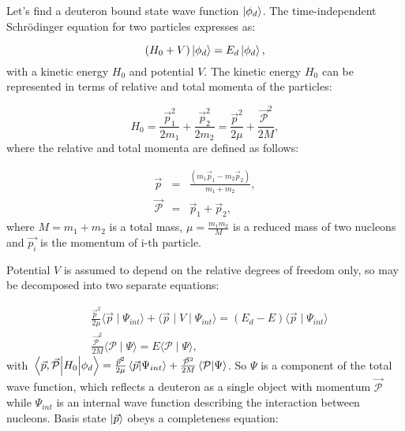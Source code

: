     Let's find a deuteron bound state wave function $\ket{\phi_d}$. 
    The time-independent Schr\"{o}dinger equation for two particles expresses as:

    \begin{equation}
        (H_0 + V) \ket{\phi_d}  = E_d \ket{\phi_d},
        \label{shrod_bound}
    \end{equation}
    with a kinetic energy $H_0$ and potential $V$. 
    The kinetic energy $H_0$ can be represented in terms of  relative and total momenta
    of the particles:

    \begin{equation}
        H_0 = \frac{\vec{p}_1^2}{2m_1} + \frac{\vec{p}_2^2}{2m_2} = 
        \frac{\vec{p}^2}{2\mu} + \frac{\vec{\mathcal{P}}^2}{2M}, 
    \end{equation}
    where the relative and total momenta are defined as follows:

    \begin{eqnarray}
        \vec{p} &=& \frac{(m_1\vec{p}_1 - m_2\vec{p}_2)}{m_1 + m_2},\\
        \vec{\mathcal{P}} &=& \vec{p}_1 + \vec{p}_2,
    \end{eqnarray}
    where $M = m_1 + m_2$ is a total mass, $\mu = \frac{m_1m_2}{M}$ is a reduced mass of two nucleons and 
    $\vec{p_i}$ is the momentum of i-th particle.

    Potential $V$ is assumed to depend on the relative degrees of freedom only, so
     may be decomposed into two separate equations:

    \begin{eqnarray}
        &\frac{\vec{p}^2}{2\mu} \langle \vec{p} \mid \Psi_{int} \rangle +
        \langle \vec{p} \mid V \mid \Psi_{int} \rangle = 
        (E_d - E)\langle \vec{p} \mid \Psi_{int} \rangle \label{se1}\\
        &\frac{\vec{\mathcal{P}}^2}{2M} \langle \mathcal{P} \mid \Psi \rangle = 
        E\langle \mathcal{P} \mid \Psi \rangle \label{se2},
    \end{eqnarray}
    with $\matrixel{\vec{p},\vec{\mathcal{P}}}{H_0}{\phi_d} = \frac{\vec{p}^2}{2\mu} \braket{\vec{p}}{\Psi_{int}} +
    \frac{\vec{\mathcal{P}}^2}{2M} \braket {\mathcal{P}} {\Psi} $. So $\Psi$ is a component 
    of the total wave function, which reflects a deuteron as a single object with momentum $\vec{\mathcal{P}}$
    while $\Psi_{int}$ is an internal wave function describing the interaction between nucleons.
    Basis state $\ket{\vec{p}}$  obeys a completeness
    equation:

